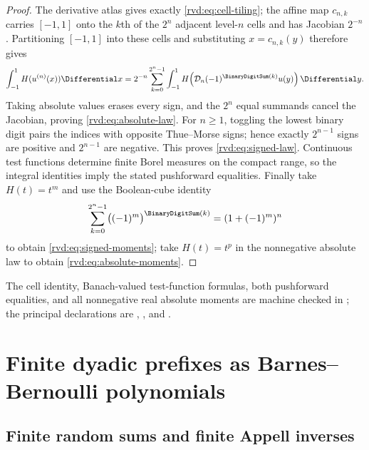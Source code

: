 \begin{proof}
The derivative atlas gives exactly \eqref{rvd:eq:cell-tiling}; the affine map
$c_{n,k}$ carries $[-1,1]$ onto the $k$th of the $2^n$ adjacent level-$n$
cells and has Jacobian $2^{-n}$.  Partitioning $[-1,1]$ into these cells and
substituting $x=c_{n,k}(y)$ therefore gives
\[
 \int_{-1}^{1}H(u^{(n)}(x))\Differential x
 =2^{-n}\sum_{k=0}^{2^n-1}
   \int_{-1}^{1}H\!\left(\mathcal D_n(-1)^{\BinaryDigitSum(k)}u(y)\right)\Differential y.
\]
Taking absolute values erases every sign, and the $2^n$ equal summands cancel
the Jacobian, proving \eqref{rvd:eq:absolute-law}.  For $n\ge1$, toggling the
lowest binary digit pairs the indices with opposite Thue--Morse signs; hence
exactly $2^{n-1}$ signs are positive and $2^{n-1}$ are negative.  This proves
\eqref{rvd:eq:signed-law}.  Continuous test functions determine finite Borel
measures on the compact range, so the integral identities imply the stated
pushforward equalities.  Finally take $H(t)=t^m$ and use the Boolean-cube
identity
\[
 \sum_{k=0}^{2^n-1}\bigl((-1)^m\bigr)^{\BinaryDigitSum(k)}
 =(1+(-1)^m)^n
\]
to obtain \eqref{rvd:eq:signed-moments}; take $H(t)=t^p$ in the nonnegative
absolute law to obtain \eqref{rvd:eq:absolute-moments}.
\end{proof}

The cell identity, Banach-valued test-function formulas, both pushforward
equalities, and all nonnegative real absolute moments are machine checked in
; the principal
declarations are ,
, and
.

\section{Finite dyadic prefixes as Barnes--Bernoulli polynomials}
\label{is:p2:sec:barnes}

\subsection{Finite random sums and finite Appell inverses}

